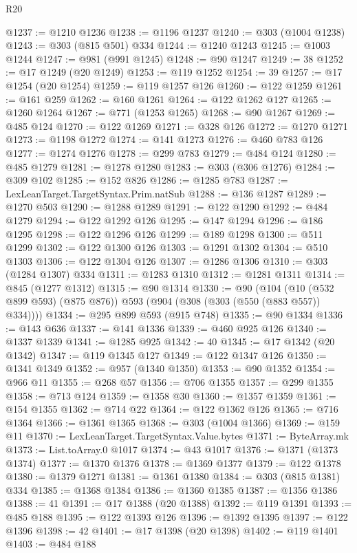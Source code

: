 \begin{lexlean}{R20}
\begin{coremodule}
@1237 := @1210 @1236
@1238 := @1196 @1237
@1240 := @303 (@1004 @1238)
@1243 := @303 (@815 @501) @334
@1244 := @1240 @1243
@1245 := @1003 @1244
@1247 := @981 (@991 @1245)
@1248 := @90 @1247
@1249 := 38
@1252 := @17 @1249 (@20 @1249)
@1253 := @119 @1252
@1254 := 39
@1257 := @17 @1254 (@20 @1254)
@1259 := @119 @1257 @126
@1260 := @122 @1259
@1261 := @161 @259
@1262 := @160 @1261
@1264 := @122 @1262 @127
@1265 := @1260 @1264
@1267 := @771 (@1253 @1265)
@1268 := @90 @1267
@1269 := @485 @124
@1270 := @122 @1269
@1271 := @328 @126
@1272 := @1270 @1271
@1273 := @1198 @1272
@1274 := @141 @1273
@1276 := @460 @783 @126
@1277 := @1274 @1276
@1278 := @299 @783
@1279 := @484 @124
@1280 := @485 @1279
@1281 := @1278 @1280
@1283 := @303 (@306 @1276)
@1284 := @309 @102
@1285 := @152 @826
@1286 := @1285 @783
@1287 := LexLeanTarget.TargetSyntax.Prim.natSub
@1288 := @136 @1287
@1289 := @1270 @503
@1290 := @1288 @1289
@1291 := @122 @1290
@1292 := @484 @1279
@1294 := @122 @1292 @126
@1295 := @147 @1294
@1296 := @186 @1295
@1298 := @122 @1296 @126
@1299 := @189 @1298
@1300 := @511 @1299
@1302 := @122 @1300 @126
@1303 := @1291 @1302
@1304 := @510 @1303
@1306 := @122 @1304 @126
@1307 := @1286 @1306
@1310 := @303 (@1284 @1307) @334
@1311 := @1283 @1310
@1312 := @1281 @1311
@1314 := @845 (@1277 @1312)
@1315 := @90 @1314
@1330 := @90
    (@104 (@10 (@532 @899 @593) (@875 @876)) @593 (@904 (@308 (@303 (@550 (@883 @557)) @334))))
@1334 := @295 @899 @593 (@915 @748)
@1335 := @90 @1334
@1336 := @143 @636
@1337 := @141 @1336
@1339 := @460 @925 @126
@1340 := @1337 @1339
@1341 := @1285 @925
@1342 := 40
@1345 := @17 @1342 (@20 @1342)
@1347 := @119 @1345 @127
@1349 := @122 @1347 @126
@1350 := @1341 @1349
@1352 := @957 (@1340 @1350)
@1353 := @90 @1352
@1354 := @966 @11
@1355 := @268 @57
@1356 := @706 @1355
@1357 := @299 @1355
@1358 := @713 @124
@1359 := @1358 @30
@1360 := @1357 @1359
@1361 := @154 @1355
@1362 := @714 @22
@1364 := @122 @1362 @126
@1365 := @716 @1364
@1366 := @1361 @1365
@1368 := @303 (@1004 @1366)
@1369 := @159 @11
@1370 := LexLeanTarget.TargetSyntax.Value.bytes
@1371 := ByteArray.mk
@1373 := List.toArray.{0} @1017
@1374 := @43 @1017
@1376 := @1371 (@1373 @1374)
@1377 := @1370 @1376
@1378 := @1369 @1377
@1379 := @122 @1378
@1380 := @1379 @1271
@1381 := @1361 @1380
@1384 := @303 (@815 @1381) @334
@1385 := @1368 @1384
@1386 := @1360 @1385
@1387 := @1356 @1386
@1388 := 41
@1391 := @17 @1388 (@20 @1388)
@1392 := @119 @1391
@1393 := @485 @188
@1395 := @122 @1393 @126
@1396 := @1392 @1395
@1397 := @122 @1396
@1398 := 42
@1401 := @17 @1398 (@20 @1398)
@1402 := @119 @1401
@1403 := @484 @188

\end{coremodule}
\end{lexlean}
